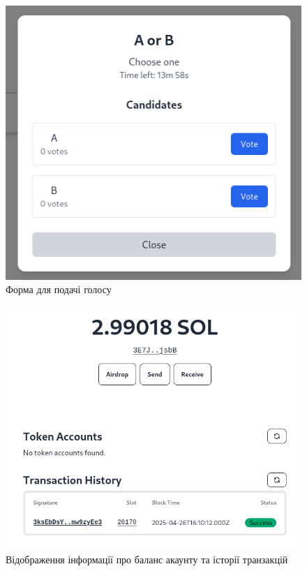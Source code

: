 \documentclass[14pt]{extreport}
\begin{document}
  \begin{figure}[H]
    \centering
    \includegraphics[scale=0.5]{UIVote}
    \caption{Форма для подачі голосу}
  \end{figure}
  
  \begin{figure}[H]
    \centering
    \includegraphics[scale=0.5]{UIAccount}
    \caption{Відображення інформації про баланс акаунту та історії транзакцій}
  \end{figure}
  
\end{document}
